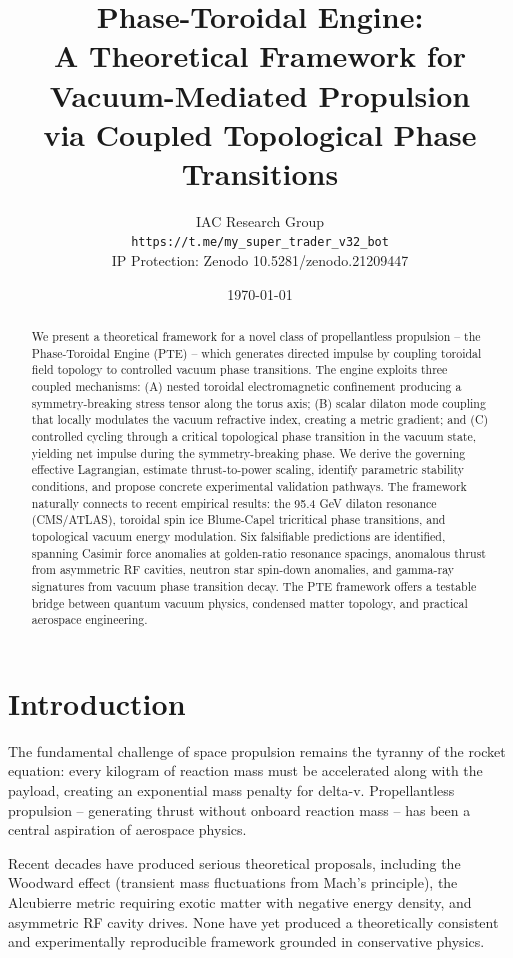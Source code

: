 \documentclass[12pt,a4paper]{article}
\title{Phase-Toroidal Engine: \\
A Theoretical Framework for Vacuum-Mediated Propulsion \\
via Coupled Topological Phase Transitions}
\author{IAC Research Group \\
\texttt{https://t.me/my\_super\_trader\_v32\_bot} \\
IP Protection: Zenodo 10.5281/zenodo.21209447}
\date{\today}
\begin{document}
\maketitle

\begin{abstract}
We present a theoretical framework for a novel class of propellantless propulsion -- the Phase-Toroidal Engine (PTE) -- which generates directed impulse by coupling toroidal field topology to controlled vacuum phase transitions. The engine exploits three coupled mechanisms: (A) nested toroidal electromagnetic confinement producing a symmetry-breaking stress tensor along the torus axis; (B) scalar dilaton mode coupling that locally modulates the vacuum refractive index, creating a metric gradient; and (C) controlled cycling through a critical topological phase transition in the vacuum state, yielding net impulse during the symmetry-breaking phase. We derive the governing effective Lagrangian, estimate thrust-to-power scaling, identify parametric stability conditions, and propose concrete experimental validation pathways. The framework naturally connects to recent empirical results: the 95.4 GeV dilaton resonance (CMS/ATLAS), toroidal spin ice Blume-Capel tricritical phase transitions, and topological vacuum energy modulation. Six falsifiable predictions are identified, spanning Casimir force anomalies at golden-ratio resonance spacings, anomalous thrust from asymmetric RF cavities, neutron star spin-down anomalies, and gamma-ray signatures from vacuum phase transition decay. The PTE framework offers a testable bridge between quantum vacuum physics, condensed matter topology, and practical aerospace engineering.
\end{abstract}

\section{Introduction}

The fundamental challenge of space propulsion remains the tyranny of the rocket equation: every kilogram of reaction mass must be accelerated along with the payload, creating an exponential mass penalty for delta-v. Propellantless propulsion -- generating thrust without onboard reaction mass -- has been a central aspiration of aerospace physics.

Recent decades have produced serious theoretical proposals, including the Woodward effect (transient mass fluctuations from Mach's principle), the Alcubierre metric requiring exotic matter with negative energy density, and asymmetric RF cavity drives. None have yet produced a theoretically consistent and experimentally reproducible framework grounded in conservative physics.
\end{document}
